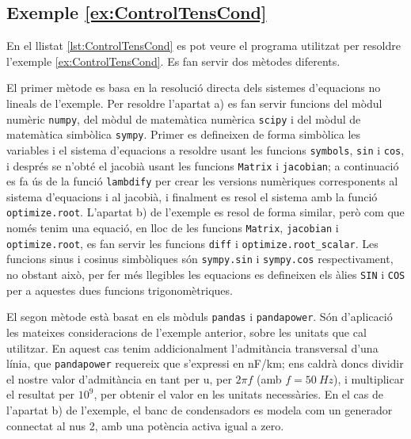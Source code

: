 \hypertarget{exemple:ControlTensCond}{\subsection{Exemple \ref*{ex:ControlTensCond} \ControlTensCond}}
En el llistat \vref{lst:ControlTensCond} es pot veure el programa utilitzat per resoldre l'exemple \vref{ex:ControlTensCond}. Es fan servir dos mètodes diferents.

El primer mètode es basa en la resolució directa dels sistemes d'equacions no lineals de l'exemple. Per resoldre l'apartat a)   es fan servir funcions del mòdul numèric \texttt{numpy}, del mòdul de matemàtica numèrica \texttt{scipy} i del mòdul de matemàtica simbòlica \texttt{sympy}. Primer es defineixen de forma simbòlica les variables i el sistema d'equacions a resoldre usant les funcions \texttt{symbols}, \texttt{sin} i \texttt{cos}, i després se n'obté el jacobià usant les funcions \texttt{Matrix} i \texttt{jacobian}; a continuació es fa ús de la funció  \texttt{lambdify} per crear les versions numèriques corresponents al sistema d'equacions i al jacobià, i finalment es resol el sistema amb la funció \texttt{optimize.root}. L'apartat b) de l'exemple es resol de forma similar, però com que només tenim una equació, en lloc de les funcions \texttt{Matrix}, \texttt{jacobian} i \texttt{optimize.root}, es fan servir les funcions \texttt{diff} i \texttt{optimize.root\_scalar}. Les funcions sinus i cosinus simbòliques són  \texttt{sympy.sin} i  \texttt{sympy.cos} respectivament, no obstant això,  per  fer més llegibles les equacions es defineixen els àlies \texttt{SIN} i \texttt{COS} per a aquestes dues funcions trigonomètriques.

El segon mètode està basat en els mòduls \texttt{pandas} i \texttt{pandapower}. Són d'aplicació les mateixes consideracions de l'exemple anterior, sobre les unitats que cal utilitzar. En aquest cas tenim addicionalment l'admitància transversal d'una línia, que \texttt{pandapower} requereix que s'expressi en \unit{nF/km}; ens caldrà doncs dividir el nostre valor d'admitància en tant per u, per $2 \pi f$ (amb $f = \qty{50}{Hz}$), i multiplicar el resultat per $10^9$, per obtenir el valor en les unitats necessàries. En el cas de l'apartat  b) de l'exemple, el banc de condensadors es modela com un generador connectat al nus 2, amb una potència activa  igual a zero.




